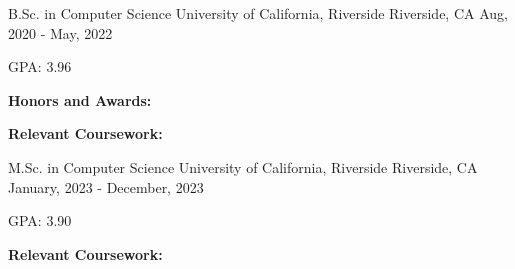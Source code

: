 
\begin{cventries}
  \cventry
  {B.Sc. in Computer Science} %
  {University of California, Riverside} %
  {Riverside, CA} %
  {Aug, 2020 -  May, 2022} %
  {
    \begin{cvitems} %
      \item {GPA: 3.96}
      \item [] \textbf{Honors and Awards:}
      \item []
      \begin{flushleft}
        \textbf{Relevant Coursework:}
      \end{flushleft}
    \end{cvitems}
  }
  \cventry
  {M.Sc. in Computer Science} %
  {University of California, Riverside} %
  {Riverside, CA} %
  {January, 2023 - December, 2023} %
  {
    \begin{cvitems} %
      \item {GPA: 3.90}
      \item []
      \begin{flushleft}
        \textbf{Relevant Coursework:}
      \end{flushleft}
    \end{cvitems}
  }
\end{cventries}
